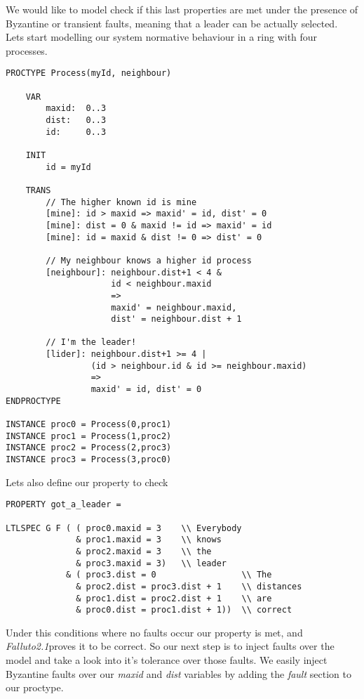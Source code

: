 \documentclass[12pt]{article}
\newcommand{\falluto}{\mbox{\textit{Falluto2.1}}}
\begin{document}
We would like to model check if this last properties are met under the presence of Byzantine or transient faults, meaning that a leader can be actually selected.\\
Lets start modelling our system normative behaviour in a ring with four processes.
\begin{verbatim}
PROCTYPE Process(myId, neighbour)

    VAR
        maxid:  0..3
        dist:   0..3
        id:     0..3

    INIT
        id = myId

    TRANS
        // The higher known id is mine
        [mine]: id > maxid => maxid' = id, dist' = 0
        [mine]: dist = 0 & maxid != id => maxid' = id
        [mine]: id = maxid & dist != 0 => dist' = 0

        // My neighbour knows a higher id process
        [neighbour]: neighbour.dist+1 < 4 &
                     id < neighbour.maxid
                     =>
                     maxid' = neighbour.maxid,
                     dist' = neighbour.dist + 1

        // I'm the leader!
        [lider]: neighbour.dist+1 >= 4 | 
                 (id > neighbour.id & id >= neighbour.maxid)
                 =>
                 maxid' = id, dist' = 0
ENDPROCTYPE

INSTANCE proc0 = Process(0,proc1)
INSTANCE proc1 = Process(1,proc2)
INSTANCE proc2 = Process(2,proc3)
INSTANCE proc3 = Process(3,proc0)
\end{verbatim}
Lets also define our property to check
\begin{verbatim}
PROPERTY got_a_leader =

LTLSPEC G F ( ( proc0.maxid = 3    \\ Everybody
              & proc1.maxid = 3    \\ knows
              & proc2.maxid = 3    \\ the
              & proc3.maxid = 3)   \\ leader
            & ( proc3.dist = 0                 \\ The
              & proc2.dist = proc3.dist + 1    \\ distances
              & proc1.dist = proc2.dist + 1    \\ are
              & proc0.dist = proc1.dist + 1))  \\ correct

\end{verbatim}
Under this conditions where no faults occur our property is met, and \falluto proves it to be correct. So our next step is to inject faults over the model and take a look into it's tolerance over those faults. We easily inject Byzantine faults over our \textit{maxid} and \textit{dist} variables by adding the \textit{fault} section to our proctype.
\end{document}
